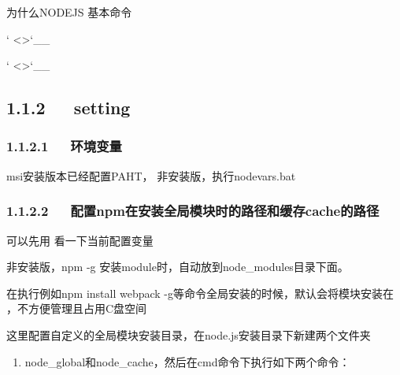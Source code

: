 \documentclass[letterpaper,12pt,english]{sphinxmanual}
\begin{document}

为什么NODEJS 基本命令 

{}` \textless{}\textgreater{}{}`\_\_

{}` \textless{}\textgreater{}{}`\_\_


\subsection{1.1.2   setting}
\label{\detokenize{001software/001install/001._u7f51_u7ad9/nodeJs:setting}}

\subsubsection{1.1.2.1   环境变量}
\label{\detokenize{001software/001install/001._u7f51_u7ad9/nodeJs:id2}}
msi安装版本已经配置PAHT，
非安装版，执行nodevars.bat


\subsubsection{1.1.2.2   配置npm在安装全局模块时的路径和缓存cache的路径}
\label{\detokenize{001software/001install/001._u7f51_u7ad9/nodeJs:npmcache}}
可以先用  看一下当前配置变量

非安装版，npm -g 安装module时，自动放到node\_modules目录下面。


在执行例如npm install webpack -g等命令全局安装的时候，默认会将模块安装在  ，不方便管理且占用C盘空间

这里配置自定义的全局模块安装目录，在node.js安装目录下新建两个文件夹
\begin{enumerate}
%
\item {} 
node\_global和node\_cache，然后在cmd命令下执行如下两个命令：

\end{enumerate}
\end{document}
